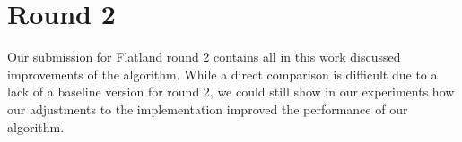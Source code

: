 
\section{Round 2}
Our submission for Flatland round 2 contains all in this work discussed improvements of the algorithm. While a direct comparison is difficult due to a lack of a baseline version for round 2, we could still show in our experiments how our adjustments to the implementation improved the performance of our algorithm.\\





